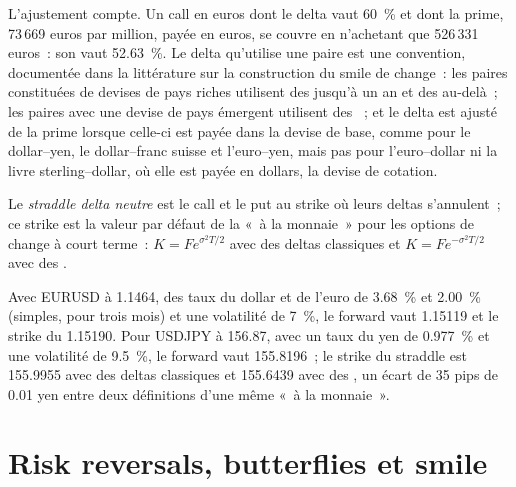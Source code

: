 L'ajustement compte. Un call en euros dont le delta vaut 60~\% et dont la prime,
73\,669 euros par million, payée en euros, se couvre en n'achetant que 526\,331
euros~: son  vaut 52.63~\%. Le delta qu'utilise une paire est une
convention, documentée dans la littérature sur la construction du smile de change~: les paires
constituées de devises de pays riches utilisent des  jusqu'à un an et des  au-delà~;
les paires avec une devise de pays émergent utilisent des ~; et le delta est
ajusté de la prime lorsque celle-ci est payée dans la devise de base, comme pour le dollar--yen,
le dollar--franc suisse et l'euro--yen, mais pas pour l'euro--dollar ni la livre sterling--dollar,
où elle est payée en dollars, la devise de cotation.

\begin{definition}\label{def:m2:the-fx-options-market:dns}
Le \emph{straddle delta neutre} est le call et le
put au strike où leurs deltas s'annulent~; ce strike est la valeur par défaut de la
«~à la monnaie~» pour les options de change à court terme~: $K = F e^{\sigma^2 T/2}$ avec des
deltas classiques et $K = F e^{-\sigma^2 T/2}$ avec des .
\end{definition}

\begin{example}\label{ex:m2:the-fx-options-market:strikes}
Avec EURUSD à 1.1464, des taux du dollar et de l'euro de 3.68~\% et 2.00~\% (simples, pour
trois mois) et une volatilité de 7~\%, le forward vaut 1.15119 et le
strike du  1.15190. Pour USDJPY à 156.87, avec un taux du yen de
0.977~\% et une volatilité de 9.5~\%, le forward vaut 155.8196~; le strike du straddle est
155.9955 avec des deltas classiques et 155.6439 avec des , un écart de
35 pips de 0.01 yen entre deux définitions d'une même «~à la monnaie~».
\end{example}

\section{Risk reversals, butterflies et smile}

